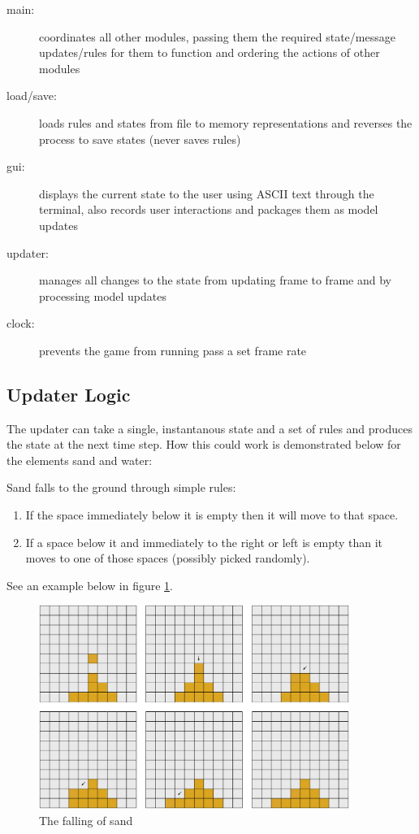 \begin{description}
  \item[main:] coordinates all other modules, passing them the required state/message updates/rules for them to function and ordering the actions of other modules
  \item[load/save:] loads rules and states from file to memory representations and reverses the process to save states (never saves rules)
  \item[gui:] displays the current state to the user using ASCII text through the terminal, also records user interactions and packages them as model updates
  \item[updater:] manages all changes to the state from updating frame to frame and by processing model updates
  \item[clock:] prevents the game from running pass a set frame rate
\end{description}

\subsection{Updater Logic}
The updater can take a single, instantanous state and a set of rules and produces the state at
the next time step. How this could work is demonstrated below for the elements sand and water:

Sand falls to the ground through simple rules:
\begin{enumerate}
  \item If the space immediately below it is empty then it will move to that space.
  \item If a space below it and immediately to the right or left is empty than it moves
    to one of those spaces (possibly picked randomly).
\end{enumerate}
See an example below in figure \ref{fig:sand}.

\begin{figure}[H]
  \caption{The falling of sand}
  \label{fig:sand}
  \vspace{3em}
  \center\includegraphics[width=0.9\textwidth]{images/grid_sand}
\end{figure}

